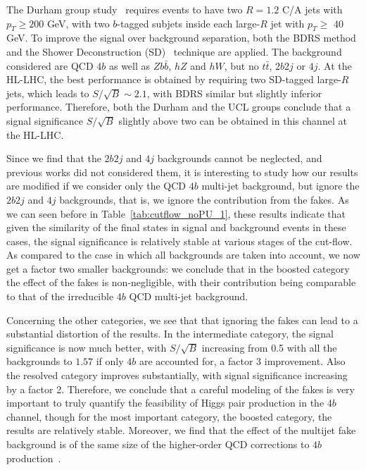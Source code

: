 The Durham group study~\cite{deLima:2014dta} requires events
to have two $R=1.2$ C/A jets with $p_T\ge 200$ GeV, with
two $b$-tagged subjets inside each large-$R$ jet with
$p_T \ge$ 40 GeV.
%
To improve the signal over background separation, both the BDRS
method and the Shower Deconstruction (SD)~\cite{Soper:2011cr,Soper:2012pb}
technique are applied.
%
The background considered are QCD $4b$ as well as $Zb\bar{b}$, $hZ$ and
$hW$, but no $t\bar{t}$, $2b2j$ or $4j$.
%
At the HL-LHC, the best performance is obtained by requiring two
SD-tagged large-$R$ jets, which leads to $S/\sqrt{B}\sim 2.1$,
with BDRS similar but slightly inferior performance.
%
Therefore, both the Durham and the UCL groups conclude that a signal
significance $S/\sqrt{B}$ slightly above two can  be obtained
in this channel at the HL-LHC.

Since we find that the $2b2j$ and $4j$ backgrounds cannot
be neglected, and previous works did not considered them,
it is interesting to
study how our results are modified if we consider only the QCD $4b$
multi-jet background, but ignore the $2b2j$ and $4j$ backgrounds,
that is, we ignore the contribution from the fakes.
%
As we can seen before in Table~\ref{tab:cutflow_noPU_1},
these results indicate that given the similarity of the final states
in signal and background events in these cases, the signal significance is
relatively stable at various stages of the cut-flow.
%
As compared to the case in which all backgrounds are taken into account, we
now get a factor two smaller backgrounds: we conclude that in the boosted category
the effect of the fakes is non-negligible, with their contribution being
comparable to that of the irreducible $4b$ QCD multi-jet background.

Concerning the other categories, we see that that ignoring the fakes can lead to a substantial
distortion of the results.
%
In the intermediate category, the signal significance is now much better, with $S/\sqrt{B}$ increasing from
0.5 with all the backgrounds to $1.57$ if only $4b$ are accounted for, a factor 3 improvement.
%
Also the resolved category improves substantially, with signal significance increasing by a factor 2.
%
Therefore, we conclude that a careful modeling of the fakes is very important to truly quantify
the feasibility of Higgs pair production in the $4b$ channel, though for the most
important category, the boosted category, the results are relatively stable.
%
Moreover, we find that the effect of the multijet fake background is of
the same size of the higher-order QCD corrections to $4b$ production~\cite{Binoth:2009rv}.



